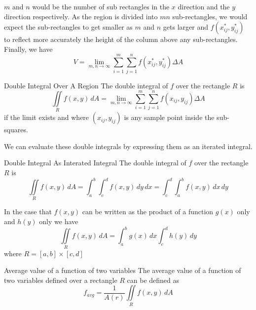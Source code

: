 \documentclass{article}
\begin{document}
	$m$ and $n$ would be the number of sub rectangles in the $x$ direction and the
	$y$ direction respectively. As the region is divided into $mn$ sub-rectangles,
	we would expect the sub-rectangles to get smaller as $m$ and $n$ gets larger and
	$f(x^{*}_{ij},y^{*}_{ij})$ to reflect more accurately the height of the column
	above any sub-rectangles. Finally, we have
	\[
		V = \lim_{m,n \to \infty}\sum_{i=1}^{m}\sum_{j=1}^{n}f(x^{*}_{ij},y^{*}_{ij})
		\Delta A
	\]
	\begin{mybox}
		{Double Integral Over A Region} The double integral of $f$ over the rectangle
		$R$ is
		\[
			\iint\limits_{R} f(x,y) \,dA = \lim_{m,n \to \infty}\sum_{i=1}^{m}\sum_{j=1}
			^{n}f(x_{ij},y_{ij}) \Delta A
		\]
		if the limit exists and where $(x_{ij},y_{ij})$ is any sample point inside the
		sub-squares.
	\end{mybox}
	We can evaluate these double integrals by expressing them as an iterated integral.
	\begin{mybox}
		{Double Integral As Interated Integral} The double integral of $f$ over the rectangle
		$R$ is
		\[
			\iint\limits_{R} f(x,y) \,dA = \int_{a}^{b}\int_{c}^{d}f(x,y) \, dy \, dx =
			\int_{c}^{d}\int_{a}^{b}f(x,y) \, dx \, dy
		\]
	\end{mybox}
	In the case that $f(x,y)$ can be written as the product of a function $g(x)$
	only and $h(y)$ only we have
	\[
		\iint\limits_{R} f(x,y) \,dA = \int_{a}^{b}g(x) \, dx \int_{c}^{d}h(y) \, dy
	\]
	where $R = [a,b] \times [c, d]$
	\begin{mybox}
		{Average value of a function of two variables} The average value of a function
		of two variables defined over a rectangle $R$ can be defined as
		\[
			f_{avg}= \frac{1}{A(r)}\iint\limits_{R} f(x,y) \,dA
		\]
	\end{mybox}
\end{document}
